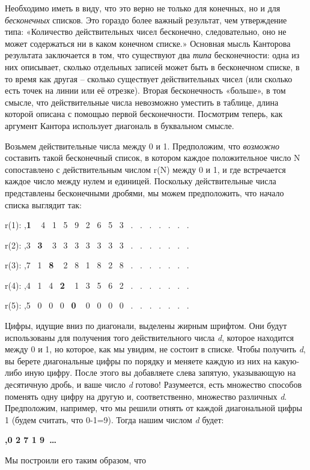 \documentclass[../main.tex]{subfiles}
\begin{document}
Необходимо иметь в виду, что это верно не только для конечных, но и для \emph{бесконечных} списков. Это гораздо более важный результат, чем утверждение типа: «Количество действительных чисел бесконечно, следовательно, оно не может содержаться ни в каком конечном списке.» Основная мысль Канторова результата заключается в том, что существуют два \emph{типа} бесконечности: одна из них описывает, сколько отдельных записей может быть в бесконечном списке, в то время как другая \--- сколько существует действительных чисел (или сколько есть точек на линии или её отрезке). Вторая бесконечность «больше», в том смысле, что действительные числа невозможно уместить в таблице, длина которой описана с помощью первой бесконечности. Посмотрим теперь, как аргумент Кантора использует диагональ в буквальном смысле.

Возьмем действительные числа между 0 и 1. Предположим, что \emph{возможно} составить такой бесконечный список, в котором каждое положительное число N сопоставлено с действительным числом r(N) между 0 и 1, и где встречается каждое число между нулем и единицей. Поскольку действительные числа представлены бесконечными дробями, мы можем предположить, что начало списка выглядит так:

r(1): ,\textbf{1} ~ 4~ 1~ 5~ 9~ 2~ 6~ 5~ 3~ .~ .~ .~ .~ .~ .~ .

r(2): ,3~ \textbf{3} ~ 3~ 3~ 3~ 3~ 3~ 3~ 3~ .~ .~ .~ .~ .~ .~ .

r(3): ,7~ 1~ \textbf{8} ~ 2~ 8~ 1~ 8~ 2~ 8~ .~ .~ .~ .~ .~ .~ .

r(4): ,4~ 1~ 4~ \textbf{2} ~ 1~ 3~ 5~ 6~ 2~ .~ .~ .~ .~ .~ .~ .

r(5): ,5~ 0~ 0~ 0~ \textbf{0} ~ 0~ 0~ 0~ 0~ .~ .~ .~ .~ .~ .~ .

Цифры, идущие вниз по диагонали, выделены жирным шрифтом. Они будут использованы для получения того действительного числа \emph{d}, которое находится между 0 и 1, но которое, как мы увидим, не состоит в списке. Чтобы получить \emph{d}, вы берете диагональные цифры по порядку и меняете каждую из них на какую-либо иную цифру. После этого вы добавляете слева запятую, указывающую на десятичную дробь, и ваше число \emph{d} готово! Разумеется, есть множество способов поменять одну цифру на другую и, соответственно, множество различных \emph{d}. Предположим, например, что мы решили отнять от каждой диагональной цифры 1 (будем считать, что 0-1=9). Тогда нашим числом \emph{d} будет:

\textbf{,0 2 7 1 9~\ldots{}}

Мы построили его таким образом, что
\end{document}
